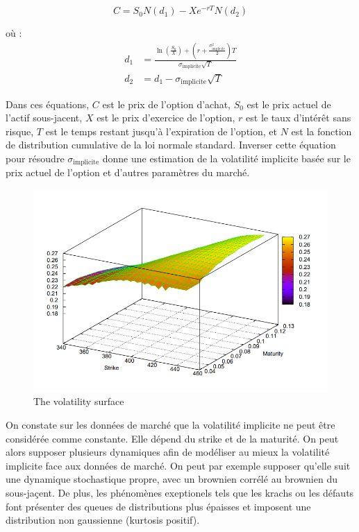 \documentclass[a4paper]{article}
\begin{document}
\begin{equation}
C = S_0 N(d_1) - Xe^{-rT}N(d_2)
\end{equation}

où :
\begin{align*}
d_1 &= \frac{\ln\left(\frac{S_0}{X}\right) + \left(r + \frac{\sigma_{\text{implicite}}^2}{2}\right)T}{\sigma_{\text{implicite}}\sqrt{T}} \\
d_2 &= d_1 - \sigma_{\text{implicite}}\sqrt{T}
\end{align*}

Dans ces équations, \(C\) est le prix de l'option d'achat, \(S_0\) est le prix actuel de l'actif sous-jacent, \(X\) est le prix d'exercice de l'option, \(r\) est le taux d'intérêt sans risque, \(T\) est le temps restant jusqu'à l'expiration de l'option, et \(N\) est la fonction de distribution cumulative de la loi normale standard.
\vspace{2mm}
Inverser cette équation pour résoudre \(\sigma_{\text{implicite}}\) donne une estimation de la volatilité implicite basée sur le prix actuel de l'option et d'autres paramètres du marché.

\begin{figure}[H]
    \centering
    \includegraphics[scale=0.7]{implied_vol.png}
    \caption{The volatility surface}
    \label{fig:enter-label}
\end{figure}

On constate sur les données de marché que la volatilité implicite ne peut être considérée comme constante. Elle dépend du strike et de la maturité. On peut alors supposer plusieurs dynamiques afin de modéliser au mieux la volatilité implicite face aux données de marché. On peut par exemple supposer qu'elle suit une dynamique stochastique propre, avec un brownien corrélé au brownien du sous-jaçent. De plus, les phénomènes exeptionels tels que les krachs ou les défauts font présenter des queues de distributions plus épaisses et imposent une distribution non gaussienne (kurtosis positif). 
\end{document}
